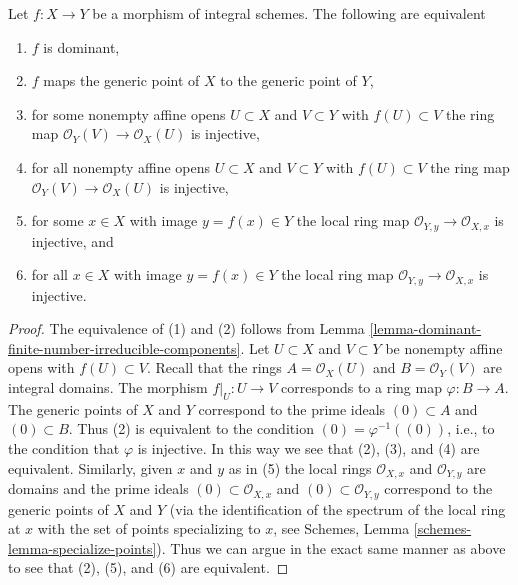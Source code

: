 \begin{lemma}
\label{lemma-dominant-between-integral}
Let $f : X \to Y$ be a morphism of integral schemes. The following
are equivalent
\begin{enumerate}
\item $f$ is dominant,
\item $f$ maps the generic point of $X$ to the generic point of $Y$,
\item for some nonempty affine opens $U \subset X$ and $V \subset Y$
with $f(U) \subset V$ the ring map $\mathcal{O}_Y(V) \to \mathcal{O}_X(U)$
is injective,
\item for all nonempty affine opens $U \subset X$ and $V \subset Y$
with $f(U) \subset V$ the ring map $\mathcal{O}_Y(V) \to \mathcal{O}_X(U)$
is injective,
\item for some $x \in X$ with image $y = f(x) \in Y$ the local ring
map $\mathcal{O}_{Y, y} \to \mathcal{O}_{X, x}$ is injective, and
\item for all $x \in X$ with image $y = f(x) \in Y$ the local ring
map $\mathcal{O}_{Y, y} \to \mathcal{O}_{X, x}$ is injective.
\end{enumerate}
\end{lemma}

\begin{proof}
The equivalence of (1) and (2) follows from
Lemma \ref{lemma-dominant-finite-number-irreducible-components}.
Let $U \subset X$ and $V \subset Y$ be nonempty affine opens with
$f(U) \subset V$. Recall that the rings $A = \mathcal{O}_X(U)$
and $B = \mathcal{O}_Y(V)$ are integral domains.
The morphism $f|_U : U \to V$ corresponds to a ring map
$\varphi : B \to A$. The generic points of $X$ and $Y$ correspond
to the prime ideals $(0) \subset A$ and $(0) \subset B$. Thus
(2) is equivalent to the condition $(0) = \varphi^{-1}((0))$,
i.e., to the condition that $\varphi$ is injective.
In this way we see that (2), (3), and (4) are equivalent.
Similarly, given $x$ and $y$ as in (5) the local rings
$\mathcal{O}_{X, x}$ and $\mathcal{O}_{Y, y}$ are domains
and the prime ideals $(0) \subset \mathcal{O}_{X, x}$
and $(0) \subset \mathcal{O}_{Y, y}$ correspond to the
generic points of $X$ and $Y$ (via the identification of
the spectrum of the local ring at $x$
with the set of points specializing to $x$, see
Schemes, Lemma \ref{schemes-lemma-specialize-points}).
Thus we can argue in the exact same manner as above
to see that (2), (5), and (6) are equivalent.
\end{proof}








